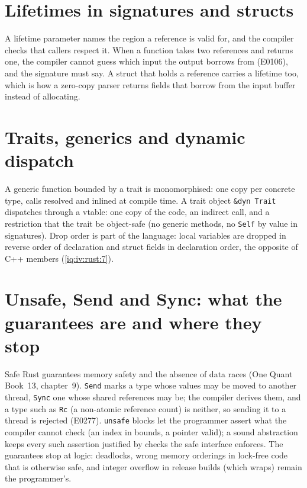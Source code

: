 \label{lst:iv:rust:split}

\section{Lifetimes in signatures and structs}

A lifetime parameter names the region a reference is valid for, and the compiler checks that callers respect it. When a
function takes two references and returns one, the compiler cannot guess which input the output borrows from (E0106), and the
signature must say. A struct that holds a reference carries a lifetime too, which is how a zero-copy parser returns fields that
borrow from the input buffer instead of allocating.

\label{lst:iv:rust:fields}

\section{Traits, generics and dynamic dispatch}

A generic function bounded by a trait is monomorphised: one copy per concrete type, calls resolved and inlined at compile
time. A trait object \texttt{\&dyn Trait} dispatches through a vtable: one copy of the code, an indirect call, and a restriction
that the trait be object-safe (no generic methods, no \texttt{Self} by value in signatures). Drop order is part of the language:
local variables are dropped in reverse order of declaration and struct fields in declaration order, the opposite of C++
members (\cref{iq:iv:rust:7}).

\section{Unsafe, Send and Sync: what the guarantees are and where they stop}

Safe Rust guarantees memory safety and the absence of data races (One Quant Book~13, chapter~9). \texttt{Send} marks a type whose
values may be moved to another thread, \texttt{Sync} one whose shared references may be; the compiler derives them, and a type
such as \texttt{Rc} (a non-atomic reference count) is neither, so sending it to a thread is rejected (E0277). \texttt{unsafe}
blocks let the programmer assert what the compiler cannot check (an index in bounds, a pointer valid); a sound abstraction
keeps every such assertion justified by checks the safe interface enforces. The guarantees stop at logic: deadlocks, wrong
memory orderings in lock-free code that is otherwise safe, and integer overflow in release builds (which wraps) remain the
programmer's.

